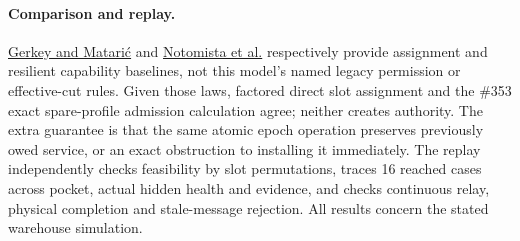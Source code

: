 \documentclass[11pt]{article}
\begin{document}
\paragraph{Comparison and replay.}
\href{https://robotics.usc.edu/publications/347/}{Gerkey and Matari\'c} and \href{https://arxiv.org/abs/2105.05586}{Notomista et al.} respectively provide assignment and resilient capability baselines, not this model's named legacy permission or effective-cut rules. Given those laws, factored direct slot assignment and the \#353 exact spare-profile admission calculation agree; neither creates authority. The extra guarantee is that the same atomic epoch operation preserves previously owed service, or an exact obstruction to installing it immediately. The replay independently checks feasibility by slot permutations, traces 16 reached cases across pocket, actual hidden health and evidence, and checks continuous relay, physical completion and stale-message rejection. All results concern the stated warehouse simulation.
\end{document}
